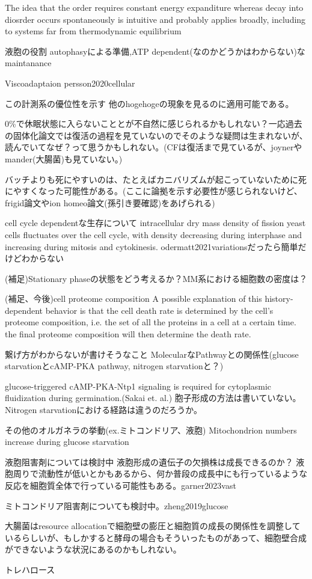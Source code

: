  The idea that the order requires constant energy expanditure whereas decay into diosrder occurs spontaneously is intuitive and probably applies broadly, including to systems far from thermodynamic equilibrium

液胞の役割
autophasyによる準備,ATP dependent(なのかどうかはわからない)なmaintanance

Viscoadaptaion
persson2020cellular

この計測系の優位性を示す
他のhogehogeの現象を見るのに適用可能である。

0\%で休眠状態に入らないこととが不自然に感じられるかもしれない？一応過去の固体化論文では復活の過程を見ていないのでそのような疑問は生まれないが、読んでいてなぜ？って思うかもしれない。(CFは復活まで見ているが、joynerやmander(大腸菌)も見ていない。)

バッチよりも死にやすいのは、たとえばカニバリズムが起こっていないために死にやすくなった可能性がある。(ここに論拠を示す必要性が感じられないけど、frigid論文やion homeo論文(孫引き要確認)をあげられる)

cell cycle dependentな生存について
intracellular dry mass density of fission yeast cells fluctuates over the cell cycle, with density decreasing during interphase and increasing during mitosis and cytokinesis. odermatt2021variationsだったら簡単だけどわからない

(補足)Stationary phaseの状態をどう考えるか？MM系における細胞数の密度は？

(補足、今後)cell proteome composition
A possible explanation of this history-dependent behavior is that the cell death rate is determined by the cell’s proteome composition, i.e. the set of all the proteins in a cell at a certain time.
the final proteome composition will then determine the death rate.



繋げ方がわからないが書けそうなこと
MolecularなPathwayとの関係性(glucose starvationとcAMP-PKA pathway, nitrogen starvationと？)

glucose-triggered cAMP-PKA-Ntp1 signaling is required for cytoplasmic fluidization during germination.(Sakai et. al.)
胞子形成の方法は書いていない。Nitrogen starvationにおける経路は違うのだろうか。


その他のオルガネラの挙動(ex.ミトコンドリア、液胞)
Mitochondrion numbers increase during glucose starvation

液胞阻害剤については検討中
液胞形成の遺伝子の欠損株は成長できるのか？
液胞周りで流動性が低いとかもあるから、何か普段の成長中にも行っているような反応を細胞質全体で行っている可能性もある。garner2023vast

ミトコンドリア阻害剤についても検討中。zheng2019glucose

大腸菌はresource allocationで細胞壁の膨圧と細胞質の成長の関係性を調整しているらしいが、もしかすると酵母の場合もそういったものがあって、細胞壁合成ができないような状況にあるのかもしれない。

トレハロース
